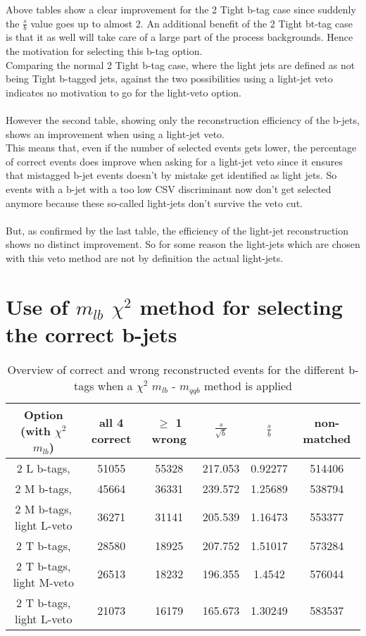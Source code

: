 Above tables show a clear improvement for the 2 Tight b-tag case since suddenly the $\frac{s}{b}$ value goes up to almost 2. An additional benefit of the 2 Tight bt-tag case is that it as well will take care of a large part of the process backgrounds. Hence the motivation for selecting this b-tag option.\\
Comparing the normal 2 Tight b-tag case, where the light jets are defined as not being Tight b-tagged jets, against the two possibilities using a light-jet veto indicates no motivation to go for the light-veto option.\\
\\
However the second table, showing only the reconstruction efficiency of the b-jets, shows an improvement when using a light-jet veto.\\
This means that, even if the number of selected events gets lower, the percentage of correct events does improve when asking for a light-jet veto since it ensures that mistagged b-jet events doesn't by mistake get identified as light jets. So events with a b-jet with a too low CSV discriminant now don't get selected anymore because these so-called light-jets don't survive the veto cut.\\
\\
But, as confirmed by the last table, the efficiency of the light-jet reconstruction shows no distinct improvement. So for some reason the light-jets which are chosen with this veto method are not by definition the actual light-jets.

\section{Use of $m_{lb}$ $\chi^{2}$ method for selecting the correct b-jets}
 \begin{table}[!h] 
 \begin{tabular}{c|c|c|c|c|c} 
 \textbf{Option} (with $\chi^{2}$ $m_{lb}$) & all 4 correct      & $\geq$ 1 wrong  & $\frac{s}{\sqrt{b}}$ & $\frac{s}{b}$ & non-matched \\ \hline 
2 L b-tags,                & 51055 & 55328 & 217.053 & 0.92277 & 514406 \\ 
2 M b-tags,              & 45664 & 36331 & 239.572 & 1.25689 & 538794 \\ 
2 M b-tags, light L-veto & 36271 & 31141 & 205.539 & 1.16473 & 553377 \\ 
2 T b-tags,              & 28580 & 18925 & 207.752 & 1.51017 & 573284 \\ 
2 T b-tags, light M-veto & 26513 & 18232 & 196.355 & 1.4542 & 576044 \\ 
2 T b-tags, light L-veto & 21073 & 16179 & 165.673 & 1.30249 & 583537 \\ 
 \end{tabular} 
 \caption{Overview of correct and wrong reconstructed events for the different b-tags when a $\chi^{2}$ $m_{lb}$ - $m_{qqb}$ method is applied} 
 \end{table}
 
